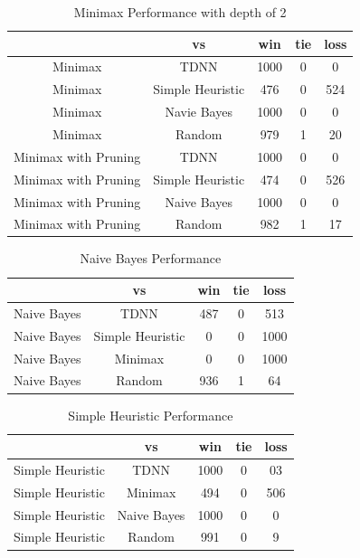 \documentclass[12pt,letterpaper]{article}
\begin{document}
\begin{table}[h]
\begin{center}
\begin{tabular}{|c||c|c|c|c|}
\hline
& vs & win & tie & loss\\
\hline \hline
Minimax & TDNN & 1000 & 0 & 0\\
\hline 
Minimax & Simple Heuristic & 476 & 0 & 524\\
\hline 
Minimax & Navie Bayes & 1000 & 0 & 0\\
\hline 
Minimax & Random & 979 & 1 & 20\\
\hline 
Minimax with Pruning & TDNN & 1000 & 0 & 0\\
\hline 
Minimax with Pruning & Simple Heuristic & 474 & 0 & 526\\
\hline 
Minimax with Pruning & Naive Bayes & 1000 & 0 & 0\\
\hline 
Minimax with Pruning & Random & 982 & 1 & 17\\
\hline 
\end{tabular}
\end{center}
\caption{Minimax Performance with depth of 2}
\label{MinimaxTable}
\end{table}


\begin{table}[h]
\begin{center}
\begin{tabular}{|c||c|c|c|c|}
\hline
& vs & win & tie & loss\\
\hline \hline
Naive Bayes & TDNN & 487 & 0 & 513\\
\hline 
Naive Bayes & Simple Heuristic & 0 & 0 & 1000\\
\hline 
Naive Bayes & Minimax & 0 & 0 & 1000\\
\hline 
Naive Bayes & Random & 936 & 1 & 64\\
\hline 
\end{tabular}
\end{center}
\caption{Naive Bayes Performance}
\label{NaiveBayesTable}
\end{table}

\begin{table}[h]
\begin{center}
\begin{tabular}{|c||c|c|c|c|}
\hline
& vs & win & tie & loss\\
\hline \hline
Simple Heuristic & TDNN & 1000 & 0 & 03\\
\hline 
Simple Heuristic & Minimax & 494 & 0 & 506\\
\hline 
Simple Heuristic & Naive Bayes & 1000 & 0 & 0\\
\hline 
Simple Heuristic & Random & 991 & 0 & 9\\
\hline 
\end{tabular}
\end{center}
\caption{Simple Heuristic Performance}
\label{HeuristicTable}
\end{table}
\end{document}
